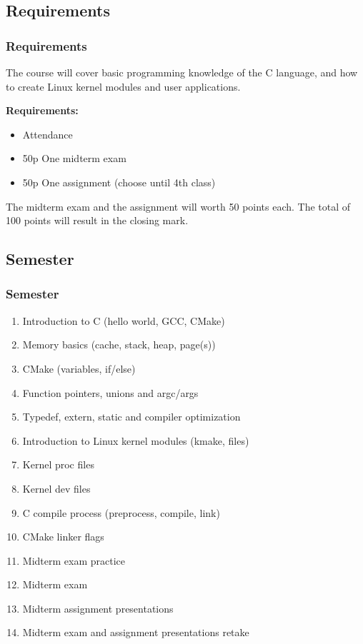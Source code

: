 \documentclass[
	11pt, %
]{beamer}
\begin{document}
\begin{frame}
    \subsection{Requirements}
	\frametitle{Requirements}

    The course will cover basic programming knowledge of the C language,
    and how to create Linux kernel modules and user applications.

	\bigskip %

    \textbf{Requirements:}
	\begin{itemize}
		\item Attendance
		\item 50p One midterm exam
        \item 50p One assignment (choose until 4th class)
	\end{itemize}

	\bigskip %

    The midterm exam and the assignment will worth 50 points each.
    The total of 100 points will result in the closing mark.

\end{frame}

\begin{frame}
    \subsection{Semester}
	\frametitle{Semester}

	\begin{enumerate}
        \item Introduction to C (hello world, GCC, CMake)
        \item Memory basics (cache, stack, heap, page(s))
        \item CMake (variables, if/else)
        \item Function pointers, unions and argc/args
        \item Typedef, extern, static and compiler optimization
        \item Introduction to Linux kernel modules (kmake, files)
        \item Kernel proc files
        \item Kernel dev files
        \item C compile process (preprocess, compile, link)
        \item CMake linker flags
        \item Midterm exam practice
        \item Midterm exam
        \item Midterm assignment presentations
        \item Midterm exam and assignment presentations retake
	\end{enumerate}

\end{frame}
\end{document}
